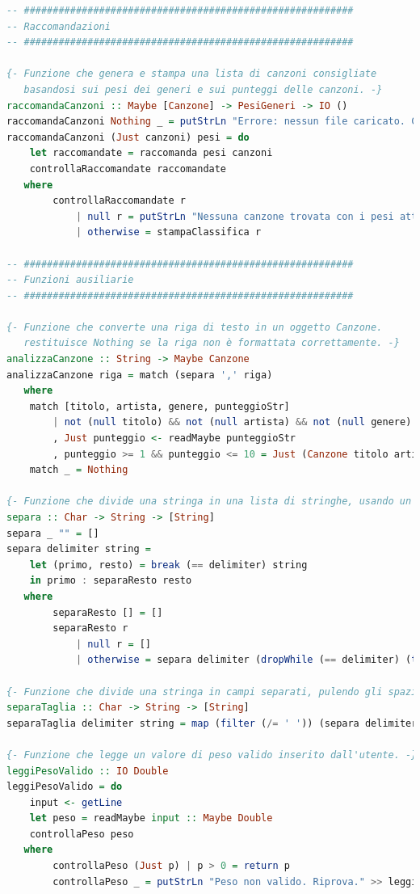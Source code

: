 \documentclass[a4paper,11pt]{article}
\begin{document}
\begin{lstlisting}[language=Haskell]
-- #########################################################
-- Raccomandazioni
-- #########################################################

{- Funzione che genera e stampa una lista di canzoni consigliate
   basandosi sui pesi dei generi e sui punteggi delle canzoni. -}
raccomandaCanzoni :: Maybe [Canzone] -> PesiGeneri -> IO ()
raccomandaCanzoni Nothing _ = putStrLn "Errore: nessun file caricato. Carica un file prima di continuare."
raccomandaCanzoni (Just canzoni) pesi = do
    let raccomandate = raccomanda pesi canzoni
    controllaRaccomandate raccomandate
   where
        controllaRaccomandate r
            | null r = putStrLn "Nessuna canzone trovata con i pesi attuali."
            | otherwise = stampaClassifica r

-- #########################################################
-- Funzioni ausiliarie
-- #########################################################

{- Funzione che converte una riga di testo in un oggetto Canzone.
   restituisce Nothing se la riga non è formattata correttamente. -}
analizzaCanzone :: String -> Maybe Canzone
analizzaCanzone riga = match (separa ',' riga)
   where
    match [titolo, artista, genere, punteggioStr]
        | not (null titolo) && not (null artista) && not (null genere) && not (null punteggioStr)
        , Just punteggio <- readMaybe punteggioStr
        , punteggio >= 1 && punteggio <= 10 = Just (Canzone titolo artista genere punteggio)
    match _ = Nothing

{- Funzione che divide una stringa in una lista di stringhe, usando un delimitatore. -}
separa :: Char -> String -> [String]
separa _ "" = []
separa delimiter string =
    let (primo, resto) = break (== delimiter) string
    in primo : separaResto resto
   where
        separaResto [] = []
        separaResto r
            | null r = []
            | otherwise = separa delimiter (dropWhile (== delimiter) (tail r))

{- Funzione che divide una stringa in campi separati, pulendo gli spazi. -}
separaTaglia :: Char -> String -> [String]
separaTaglia delimiter string = map (filter (/= ' ')) (separa delimiter string)

{- Funzione che legge un valore di peso valido inserito dall'utente. -}
leggiPesoValido :: IO Double
leggiPesoValido = do
    input <- getLine
    let peso = readMaybe input :: Maybe Double
    controllaPeso peso
   where
        controllaPeso (Just p) | p > 0 = return p
        controllaPeso _ = putStrLn "Peso non valido. Riprova." >> leggiPesoValido


\end{lstlisting}
\end{document}
